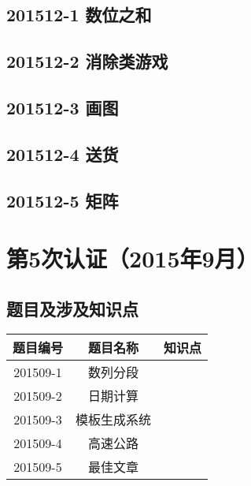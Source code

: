 \documentclass[cn,10pt,math=newtx,citestyle=gb7714-2015,bibstyle=gb7714-2015]{elegantbook}
\newif\ifonlyanalyze %
\begin{document}
\newpage
\section{201512-1 数位之和}
\ifonlyanalyze
\else
    
\fi


\newpage
\section{201512-2 消除类游戏}
\ifonlyanalyze
\else
    
\fi


\newpage
\section{201512-3 画图}
\ifonlyanalyze
\else
    
\fi


\newpage
\section{201512-4 送货}
\ifonlyanalyze
\else
    
\fi


\newpage
\section{201512-5 矩阵}
\ifonlyanalyze
\else
    
\fi



\chapter{第5次认证（2015年9月）}

\section{题目及涉及知识点}

\begin{table}[htbp]
    \centering
    \begin{tabular}{ccc}
        \toprule
        题目编号 & 题目名称     & 知识点 \\
        \midrule
        201509-1 & 数列分段     &        \\
        201509-2 & 日期计算     &        \\
        201509-3 & 模板生成系统 &        \\
        201509-4 & 高速公路     &        \\
        201509-5 & 最佳文章     &        \\
        \bottomrule
    \end{tabular}
\end{table}
\end{document}
